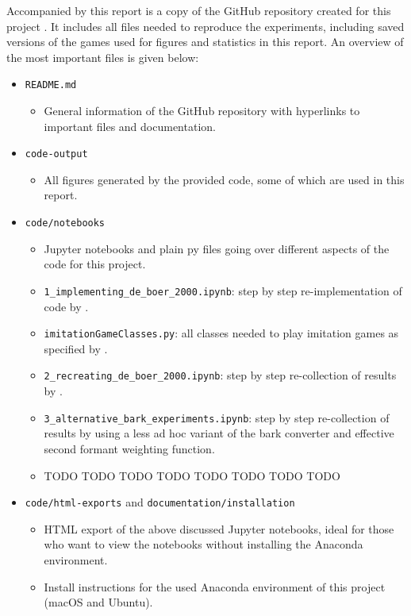 Accompanied by this report is a copy of the GitHub repository created for this project \citep{github_project}.
It includes all files needed to reproduce the experiments, including saved versions of the games used for figures and statistics in this report.
An overview of the most important files is given below:
\begin{itemize}
    \item \texttt{README.md}
    \begin{itemize}
        \item General information of the GitHub repository with hyperlinks to important files and documentation. 
    \end{itemize}
    \item \texttt{code-output}
    \begin{itemize}
        \item All figures generated by the provided code, some of which are used in this report.
    \end{itemize}
    \item \texttt{code/notebooks}
    \begin{itemize}
        \item Jupyter notebooks and plain py files going over different aspects of the code for this project.
        \item \texttt{1\_implementing\_de\_boer\_2000.ipynb}: step by step re-implementation of code by \citet{deBoer2000}.
        \item \texttt{imitationGameClasses.py}: all classes needed to play imitation games as specified by \citet{deBoer2000}.
        \item \texttt{2\_recreating\_de\_boer\_2000.ipynb}: step by step re-collection of results by \citet{deBoer2000}.
        \item \texttt{3\_alternative\_bark\_experiments.ipynb}: step by step re-collection of results by \citet{deBoer2000} using a less ad hoc variant of the bark converter and effective second formant weighting function.
        \item TODO TODO TODO TODO TODO TODO TODO TODO
    \end{itemize}
    \item \texttt{code/html-exports} and \texttt{documentation/installation}
    \begin{itemize}
        \item HTML export of the above discussed Jupyter notebooks, ideal for those who want to view the notebooks without installing the Anaconda environment.
        \item Install instructions for the used Anaconda environment of this project (macOS and Ubuntu).
    \end{itemize}
\end{itemize}